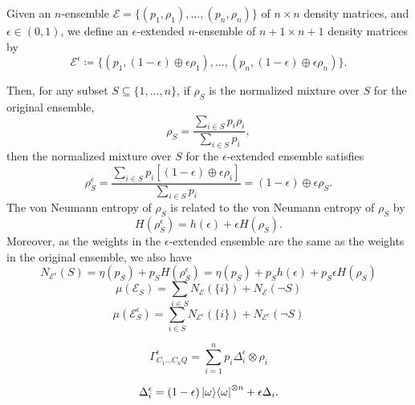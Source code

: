 \documentclass[notitlepage, 10pt]{article}
\begin{document}
Given an $n$-ensemble $\mathcal E = \{(p_1, \rho_1), \ldots, (p_n, \rho_n)\}$ of $n\times n$ density matrices, and $\epsilon \in (0,1)$, we define an $\epsilon$-extended $n$-ensemble of $n+1 \times n+1$ density matrices by
\begin{equation}
    \mathcal E^{\epsilon} \coloneqq \{ (p_1, (1-\epsilon) \oplus \epsilon \rho_1), \ldots, (p_n, (1-\epsilon) \oplus \epsilon\rho_n) \}.
\end{equation}

Then, for any subset $S \subseteq \{1,\ldots, n\}$, if $\rho_{S}$ is the normalized mixture over $S$ for the original ensemble,
\begin{equation}
    \rho_{S} = \frac{\sum_{i\in S} p_i \rho_i}{\sum_{i\in S} p_i},
\end{equation}
then the normalized mixture over $S$ for the $\epsilon$-extended ensemble satisfies
\begin{equation}
    \rho_{S}^{\epsilon} = \frac{\sum_{i\in S} p_i [(1-\epsilon) \oplus \epsilon \rho_i]}{\sum_{i\in S} p_i} = (1-\epsilon) \oplus \epsilon \rho_{S}.
\end{equation}
The von Neumann entropy of $\rho_{S}$ is related to the von Neumann entropy of $\rho_{S}$ by
\begin{equation}
    H(\rho_{S}^{\epsilon}) = h(\epsilon) + \epsilon H(\rho_{S}).
\end{equation}
Moreover, as the weights in the $\epsilon$-extended ensemble are the same as the weights in the original ensemble, we also have
\begin{equation}
    N_{\mathcal E^{\epsilon}}(S) = \eta(p_S) + p_S H(\rho_S^{\epsilon}) = \eta(p_S) + p_S h(\epsilon) + p_S \epsilon H(\rho_S)
\end{equation}
\begin{equation}
    \mu(\mathcal E_S) = \sum_{i\in S} N_{\mathcal E}(\{ i \}) + N_{\mathcal E}(\neg S)
\end{equation}
\begin{equation}
    \mu(\mathcal E_S^{\epsilon}) = \sum_{i\in S} N_{\mathcal E^{\epsilon}}(\{ i \}) + N_{\mathcal E^{\epsilon}}(\neg S)
\end{equation}

\begin{equation}
    \Gamma_{C_1\ldots C_n Q}^{\epsilon} = \sum_{i=1}^{n} p_i \Delta_{i}^{\epsilon} \otimes \rho_i
\end{equation}

\begin{equation}
    \Delta_{i}^{\epsilon} = (1-\epsilon) \ket{\omega}\!\bra{\omega}^{\otimes n} + \epsilon \Delta_i.
\end{equation}
\end{document}
